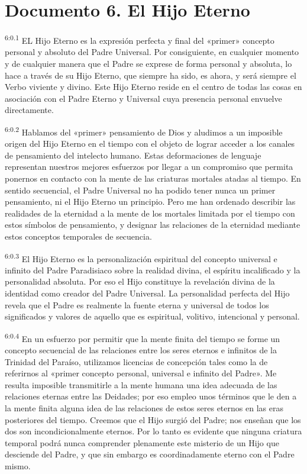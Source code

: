\chapter{Documento 6. El Hijo Eterno}
\par
\textsuperscript{6:0.1} EL Hijo Eterno es la expresión perfecta y final del «primer» concepto personal y absoluto del Padre Universal. Por consiguiente, en cualquier momento y de cualquier manera que el Padre se exprese de forma personal y absoluta, lo hace a través de su Hijo Eterno, que siempre ha sido, es ahora, y será siempre el Verbo viviente y divino. Este Hijo Eterno reside en el centro de todas las cosas en asociación con el Padre Eterno y Universal cuya presencia personal envuelve directamente.

\par
\textsuperscript{6:0.2} Hablamos del «primer» pensamiento de Dios y aludimos a un imposible origen del Hijo Eterno en el tiempo con el objeto de lograr acceder a los canales de pensamiento del intelecto humano. Estas deformaciones de lenguaje representan nuestros mejores esfuerzos por llegar a un compromiso que permita ponernos en contacto con la mente de las criaturas mortales atadas al tiempo. En sentido secuencial, el Padre Universal no ha podido tener nunca un primer pensamiento, ni el Hijo Eterno un principio. Pero me han ordenado describir las realidades de la eternidad a la mente de los mortales limitada por el tiempo con estos símbolos de pensamiento, y designar las relaciones de la eternidad mediante estos conceptos temporales de secuencia.

\par
\textsuperscript{6:0.3} El Hijo Eterno es la personalización espiritual del concepto universal e infinito del Padre Paradisiaco sobre la realidad divina, el espíritu incalificado y la personalidad absoluta. Por eso el Hijo constituye la revelación divina de la identidad como creador del Padre Universal. La personalidad perfecta del Hijo revela que el Padre es realmente la fuente eterna y universal de todos los significados y valores de aquello que es espiritual, volitivo, intencional y personal.

\par
\textsuperscript{6:0.4} En un esfuerzo por permitir que la mente finita del tiempo se forme un concepto secuencial de las relaciones entre los seres eternos e infinitos de la Trinidad del Paraíso, utilizamos licencias de concepción tales como la de referirnos al «primer concepto personal, universal e infinito del Padre». Me resulta imposible transmitirle a la mente humana una idea adecuada de las relaciones eternas entre las Deidades; por eso empleo unos términos que le den a la mente finita alguna idea de las relaciones de estos seres eternos en las eras posteriores del tiempo. Creemos que el Hijo surgió del Padre; nos enseñan que los dos son incondicionalmente eternos. Por lo tanto es evidente que ninguna criatura temporal podrá nunca comprender plenamente este misterio de un Hijo que desciende del Padre, y que sin embargo es coordinadamente eterno con el Padre mismo.

